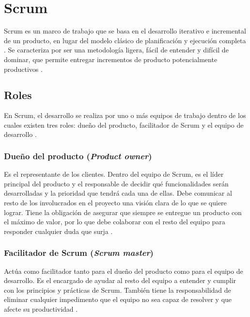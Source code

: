 \section{Scrum} \label{sect:Scrum}

Scrum es un marco de trabajo que se basa en el desarrollo iterativo e incremental de un producto, en lugar del modelo clásico de planificación y ejecución completa \cite{SCRM12}.  Se caracteriza por ser una metodología ligera, fácil de entender y difícil de dominar, que permite entregar incrementos de producto potencialmente productivos \cite{SCRM1}. 

\subsection{Roles} 

En Scrum, el desarrollo se realiza por uno o más equipos de trabajo dentro de los cuales existen tres roles: dueño del producto, facilitador de Scrum y el equipo de desarrollo \cite{SCRM12}. 
 
\subsubsection{Dueño del producto (\textit{Product owner})}

Es el representante de los clientes. Dentro del equipo de Scrum, es el líder principal del producto y el responsable de decidir qué funcionalidades serán desarrolladas y la prioridad que tendrá cada una de ellas. Debe comunicar al resto de los involucrados en el proyecto una visión clara de lo que se quiere lograr. Tiene la obligación de asegurar que siempre se entregue un producto con el máximo de valor, por lo que debe colaborar con el resto del equipo para responder cualquier duda que surja \cite{SCRM12}. %

\subsubsection{Facilitador de Scrum (\textit{Scrum master})}

Actúa como facilitador tanto para el dueño del producto como para el equipo de desarrollo. Es el encargado de ayudar al resto del equipo a entender y cumplir con los principios y prácticas de Scrum. También tiene la responsabilidad de eliminar cualquier impedimento que el equipo no sea capaz de resolver y que afecte su productividad \cite{SCRM12}. %

